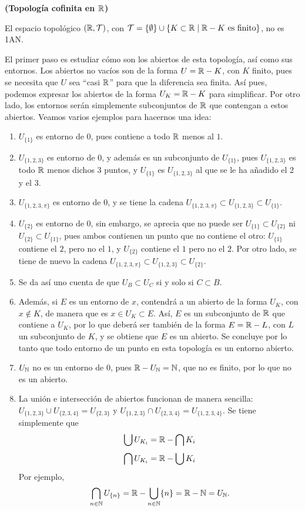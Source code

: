 \begin{ej}
    {\bf (Topología cofinita en $\mathbb{R}$)} 
    \item El espacio topológico $(\mathbb{R}, \mathcal{T})$, con $\mathcal{T} = \{\emptyset\} \cup \{K \subset \mathbb{R} \mid \mathbb{R} - K \text{ es finito}\}$, no es 1AN.\smallskip
    
    El primer paso es estudiar cómo son los abiertos de esta topología, así como sus entornos. Los abiertos no vacíos son de la forma $U = \mathbb{R} - K$, con $K$ finito, pues se necesita que $U$ sea ``casi $\mathbb{R}$'' para que la diferencia sea finita.  Así pues, podemos expresar los abiertos de la forma $U_K = \mathbb{R} - K$ para simplificar. Por otro lado, los entornos serán simplemente subconjuntos de $\mathbb{R}$ que contengan a estos abiertos. Veamos varios ejemplos para hacernos una idea:
    \begin{enumerate}[label=--, topsep=0pt, itemsep=0pt]
        \item $U_{\{1\}}$ es entorno de $0$, pues contiene a todo $\mathbb{R}$ menos al $1$.
        \item $U_{\{1,2,3\}}$ es entorno de $0$, y además es un subconjunto de $U_{\{1\}}$, pues $U_{\{1,2,3\}}$ es todo $\mathbb{R}$ menos dichos $3$ puntos, y $U_{\{1\}}$ es $U_{\{1,2,3\}}$ al que se le ha añadido el $2$ y el $3$.
        \item $U_{\{1,2,3, \pi\}}$ es entorno de $0$, y se tiene la cadena $U_{\{1,2,3,\pi\}} \subset U_{\{1,2,3\}} \subset U_{\{1\}}$. 
        \item $U_{\{2\}}$ es entorno de $0$, sin embargo, se aprecia que no puede ser $U_{\{1\}}\subset U_{\{2\}}$ ni $U_{\{2\}}\subset U_{\{1\}}$, pues ambos contienen un punto que no contiene el otro: $U_{\{1\}}$ contiene el $2$, pero no el $1$, y $U_{\{2\}}$ contiene el $1$ pero no el $2$. Por otro lado, se tiene de nuevo la cadena $U_{\{1,2,3,\pi\}} \subset U_{\{1,2,3\}} \subset U_{\{2\}}$.
        \item Se da así uno cuenta de que $U_B \subset U_C$ si y solo si $C\subset B$.
        \item Además, si $E$ es un entorno de $x$, contendrá a un abierto de la forma $U_K$, con $x\not\in K$, de manera que es $x\in U_K \subset E$. Así, $E$ es un subconjunto de $\mathbb{R}$ que contiene a $U_K$, por lo que deberá ser también de la forma $E = \mathbb{R} - L$, con $L$ un subconjunto de $K$, y se obtiene que $E$ es un abierto. Se concluye por lo tanto que todo entorno de un punto en esta topología es un entorno abierto.
        \item $U_{\mathbb{N}}$ no es un entorno de $0$, pues $\mathbb{R} - U_{\mathbb{N}} = \mathbb{N}$, que no es finito, por lo que no es un abierto.
        \item La unión e intersección de abiertos funcionan de manera sencilla: $U_{\{1,2,3\}} \cup U_{\{2,3,4\}} = U_{\{2,3\}}$ y $U_{\{1,2,3\}} \cap U_{\{2,3,4\}} = U_{\{1,2,3,4\}}$. Se tiene simplemente que 
        \[
            \bigcup U_{K_i} = \mathbb{R} - \bigcap K_i
        \]
        \[
            \bigcap U_{K_i} = \mathbb{R} - \bigcup K_i
        \]
        Por ejemplo, 
        \[
            \bigcap\limits_{n\in\mathbb{N}} U_{\{n\}} = \mathbb{R} - \bigcup\limits_{n\in\mathbb{N}} \{n\} = \mathbb{R} - \mathbb{N} = U_{\mathbb{N}}.
        \]


\end{enumerate}
\end{ej}
